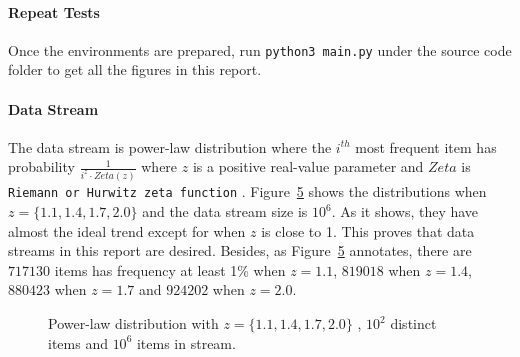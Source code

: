 \documentclass[10pt]{article}
\begin{document}
\paragraph{Repeat Tests}
Once the environments are prepared, run \texttt{python3 main.py} under the source code folder to get all the figures in this report.

\paragraph{Data Stream}
The data stream is power-law distribution where 
the $i^{th}$ most frequent item has probability $\frac{1}{i^{z} \cdot{} Zeta(z)}$
where $z$ is a positive real-value parameter and $Zeta$ is \texttt{Riemann or Hurwitz zeta function} \cite{zeta}. 
Figure~\ref{powerlaw} shows the distributions when $z = \{1.1, 1.4, 1.7, 2.0\}$ and the data stream size is $10^6$.
As it shows, they have almost the ideal trend except for when $z$ is close to 1. 
This proves that data streams in this report are desired.
Besides, as Figure~\ref{powerlaw} annotates, there are $717130$ items has frequency at least 1\% when $z=1.1$,  
$819018$ when  $z=1.4$, $880423$ when $z=1.7$ and $924202$ when $z=2.0$.


\begin{figure}[H]
     \begin{subfigure}[b]{0.5\textwidth}
          \centering
          \label{power-law-z-1.1-100-stream-1000000}
    \end{subfigure}
    \begin{subfigure}[b]{0.5\textwidth}
          \centering
          \label{power-law-z-1.4-100-stream-1000000}
    \end{subfigure}
    \begin{subfigure}[b]{0.5\textwidth}
          \centering
          \label{power-law-z-1.7-100-stream-1000000}
    \end{subfigure}
    \begin{subfigure}[b]{0.5\textwidth}
          \centering
          \label{power-law-z-2.0-100-stream-1000000}
    \end{subfigure}
 
    \caption{Power-law distribution with $z = \{1.1, 1.4, 1.7, 2.0\}$ , $10^2$ distinct items and $10^6$ items in stream.}
    \label{powerlaw}
\end{figure}
\end{document}
